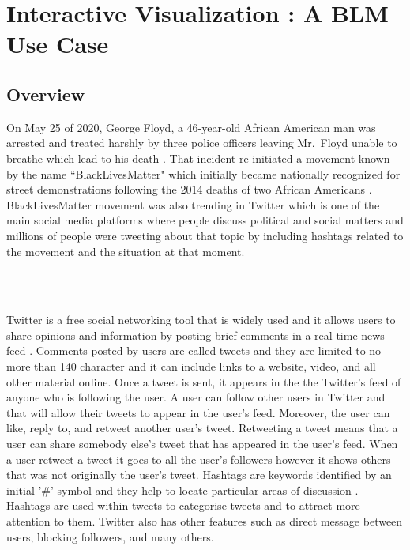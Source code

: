 \section{Interactive Visualization \cite{d3tool} : A BLM Use Case}


\subsection{Overview}

On May 25 of 2020, George Floyd, a 46-year-old African American man was arrested and treated harshly by three police officers leaving Mr.~Floyd unable to breathe which lead to his death \cite{dreyer2020death}. That incident re-initiated a movement known by the name ``BlackLivesMatter" which initially became nationally recognized for street demonstrations following the 2014 deaths of two African Americans \cite{garza2014herstory}. BlackLivesMatter movement was also trending in Twitter which is one of the main social media platforms where people discuss political and social matters and millions of people were tweeting about that topic by including hashtags related to the movement and the situation at that moment.

\\\

Twitter is a free social networking tool that is widely used and it allows users to share opinions and information by posting brief comments in a real-time news feed \cite{mistry2011critical, bristol2010twitter}. Comments posted by users are called tweets and they are limited to no more than 140 character and it can include links to a website, video, and all other material online. Once a tweet is sent, it appears in the the Twitter's feed of anyone who is following the user. A user can follow other users in Twitter and that will allow their tweets to appear in the user's feed. Moreover, the user can like, reply to, and retweet another user's tweet. Retweeting a tweet means that a user can share somebody else's tweet that has appeared in the user's feed. When a user retweet a tweet it goes to all the user's followers however it shows others that was not originally the user's tweet. Hashtags are keywords identified by an initial '#' symbol and they help to locate particular areas of discussion \cite{bristol2010twitter}. Hashtags are used within tweets to categorise tweets and to attract more attention to them. Twitter also has other features such as direct message between users, blocking followers, and many others.




